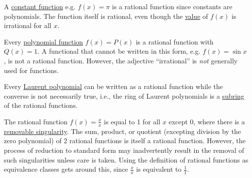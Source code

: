 \documentclass{article}
\begin{document}
A \href{https://en.wikipedia.org/wiki/Constant_function}{constant function} e.g. $f(x) = \pi$ is a rational function since constants are polynomials. The function itself is rational, even though the \href{https://en.wikipedia.org/wiki/Value_(mathematics)}{value} of $f(x)$ is irrational for all $x$.

Every \href{https://en.wikipedia.org/wiki/Polynomial_function}{polynomial function} $f(x) = P(x)$ is a rational function with $Q(x) = 1$. A functional that cannot be written in this form, e.g. $f(x) = \sin x$, is not a rational function. However, the adjective ``irrational'' is {\it not} generally used for functions.

Every \href{https://en.wikipedia.org/wiki/Laurent_polynomial}{Laurent polynomial} can be written as a rational function while the converse is not necessarily true, i.e., the ring of Laurent polynomials is a \href{https://en.wikipedia.org/wiki/Subring}{subring} of the rational functions.

The rational function $f(x) = \frac{x}{x}$ is equal to 1 for all $x$ except 0, where there is a \href{https://en.wikipedia.org/wiki/Removable_singularity}{removable singularity}. The sum, product, or quotient (excepting division by the zero polynomial) of 2 rational functions is itself a rational function. However, the process of reduction to standard form may inadvertently result in the removal of such singularities unless care is taken. Using the definition of rational functions as equivalence classes gets around this, since $\frac{x}{x}$ is equivalent to $\frac{1}{1}$.
\end{document}
